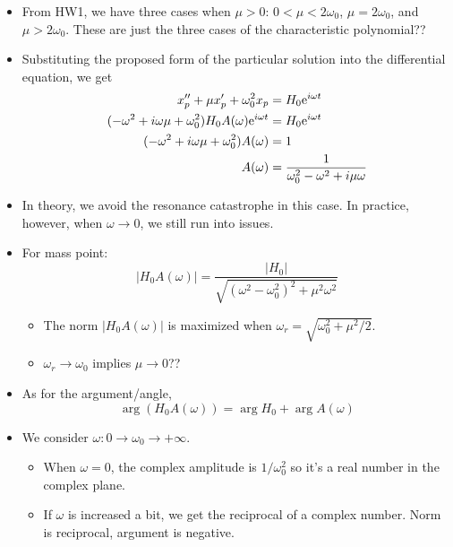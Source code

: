 \documentclass[../notes.tex]{subfiles}
\begin{document}
\begin{itemize}
\begin{equation*}
    \end{equation*}
    \begin{itemize}
        \item From HW1, we have three cases when $\mu>0$: $0<\mu<2\omega_0$, $\mu=2\omega_0$, and $\mu>2\omega_0$. These are just the three cases of the characteristic polynomial??
        \item Substituting the proposed form of the particular solution into the differential equation, we get
        \begin{align*}
            x_p''+\mu x_p'+\omega_0^2x_p &= H_0\e[i\omega t]\\
            (-\omega^2+i\omega\mu+\omega_0^2)H_0A(\omega)\e[i\omega t] &= H_0\e[i\omega t]\\
            (-\omega^2+i\omega\mu+\omega_0^2)A(\omega) &= 1\\
            A(\omega) &= \frac{1}{\omega_0^2-\omega^2+i\mu\omega}
        \end{align*}
        \item In theory, we avoid the resonance catastrophe in this case. In practice, however, when $\omega\to 0$, we still run into issues.
        \item For mass point:
        \begin{equation*}
            |H_0A(\omega)| = \frac{|H_0|}{\sqrt{(\omega^2-\omega_0^2)^2+\mu^2\omega^2}}
        \end{equation*}
        \begin{itemize}
            \item The norm $|H_0A(\omega)|$ is maximized when $\omega_r=\sqrt{\omega_0^2+\mu^2/2}$.
            \item $\omega_r\to\omega_0$ implies $\mu\to 0$??
        \end{itemize}
        \item As for the argument/angle,
        \begin{equation*}
            \arg(H_0A(\omega)) = \arg H_0+\arg A(\omega)
        \end{equation*}
        \item We consider $\omega:0\to\omega_0\to+\infty$.
        \begin{itemize}
            \item When $\omega=0$, the complex amplitude is $1/\omega_0^2$ so it's a real number in the complex plane.
            \item If $\omega$ is increased a bit, we get the reciprocal of a complex number. Norm is reciprocal, argument is negative.

\end{itemize}
\end{itemize}
\end{itemize}
\end{document}
